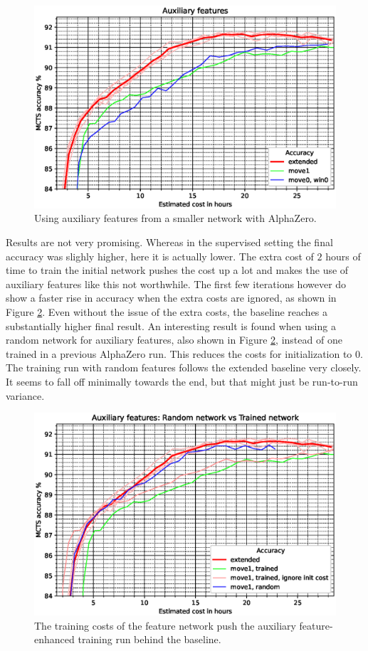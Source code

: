 \documentclass[12pt,onecolumn,oneside,titlepage]{article}
\begin{document}
\begin{figure}[H]
\centering
\includegraphics[clip,width=\columnwidth]{auxiliary_attempt1}
\caption{Using auxiliary features from a smaller network with AlphaZero.}
\label{fig:auxiliary_attempt1}
\end{figure}

Results are not very promising. Whereas in the supervised setting the final accuracy was slighly higher, here it is actually lower. The extra cost of $2$ hours of time to train the initial network pushes the cost up a lot and makes the use of auxiliary features like this not worthwhile.
The first few iterations however do show a faster rise in accuracy when the extra costs are ignored, as shown in Figure \ref{fig:rndVsTrainedAux}. Even without the issue of the extra costs, the baseline reaches a substantially higher final result.
An interesting result is found when using a random network for auxiliary features, also shown in Figure \ref{fig:rndVsTrainedAux}, instead of one trained in a previous AlphaZero run. This reduces the costs for initialization to $0$. The training run with random features follows the extended baseline very closely.
It seems to fall off minimally towards the end, but that might just be run-to-run variance. 

\begin{figure}[H]
\centering
\includegraphics[clip,width=\columnwidth]{rndVsTrainedAux}
\caption{The training costs of the feature network push the auxiliary feature-enhanced training run behind the baseline.}
\label{fig:rndVsTrainedAux}
\end{figure}
\end{document}
